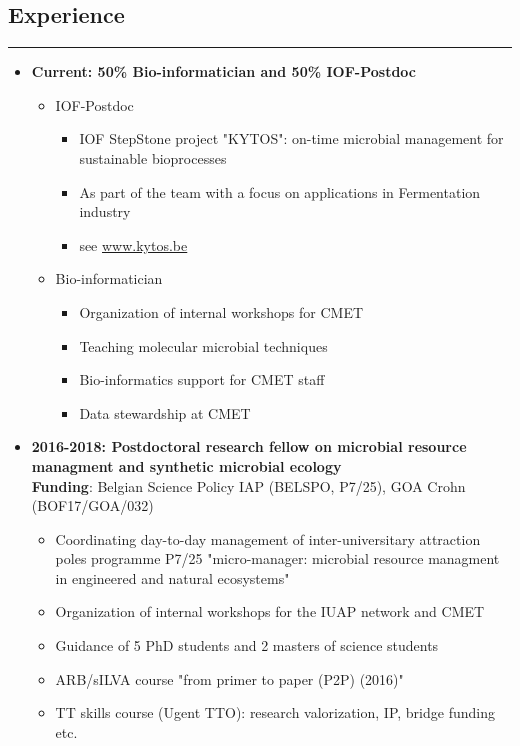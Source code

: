 \documentclass[a4paper,11pt,oneside]{article}
\begin{document}
\subsection*{Experience}
\rule{\textwidth}{1pt}
\begin{itemize}
\item \textbf{Current: 50\% Bio-informatician and 50\% IOF-Postdoc}
  \begin{itemize}
    \item IOF-Postdoc
    \begin{itemize}
      \item IOF StepStone project "KYTOS": on-time microbial management for sustainable bioprocesses
      \item As part of the team with a focus on applications in Fermentation industry
      \item see \href{https://www.kytos.be}{www.kytos.be}
    \end{itemize}
    \item Bio-informatician
    \begin{itemize}
      \item Organization of internal workshops for CMET
      \item Teaching molecular microbial techniques
      \item Bio-informatics support for CMET staff
      \item Data stewardship at CMET
    \end{itemize}
  \end{itemize}
\item \textbf{2016-2018: Postdoctoral research fellow on microbial resource managment and synthetic microbial ecology} \\
\textbf{Funding}: Belgian Science Policy IAP (BELSPO, P7/25), GOA Crohn (BOF17/GOA/032) 
    \begin{itemize}
      \item Coordinating day-to-day management of inter-universitary attraction poles programme P7/25 "micro-manager: microbial resource managment in engineered and natural ecosystems"
      \item Organization of internal workshops for the IUAP network and CMET
      \item Guidance of 5 PhD students and 2 masters of science students
      \item ARB/sILVA course "from primer to paper (P2P) (2016)"
      \item TT skills course (Ugent TTO): research valorization, IP, bridge funding etc.

\end{itemize}
\end{itemize}
\end{document}
